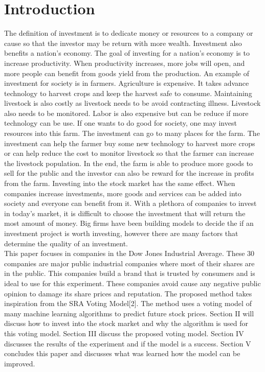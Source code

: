 \documentclass[journal]{IEEEtran}
\begin{document}
\section{Introduction}
The definition of investment is to dedicate money or resources to a company or cause so that the investor may be return with more wealth. Investment also benefits a nation's economy. The goal of investing for a nation's economy is to increase productivity. When productivity increases, more jobs will open, and more people can benefit from goods yield from the production. An example of investment for society is in farmers. Agriculture is expensive. It takes advance technology to harvest crops and keep the harvest safe to consume. Maintaining livestock is also costly as livestock needs to be avoid contracting illness. Livestock also needs to be monitored. Labor is also expensive but can be reduce if more technology can be use. If one wants to do good for society, one may invest resources into this farm. The investment can go to many places for the farm. The investment can help the farmer buy some new technology to harvest more crops or can help reduce the cost to monitor livestock so that the farmer can increase the livestock population. In the end, the farm is able to produce more goods to sell for the public and the investor can also be reward for the increase in profits from the farm. Investing into the stock market has the same effect. When companies increase investments, more goods and services can be added into society and everyone can benefit from it. With a plethora of companies to invest in today's market, it is difficult to choose the investment that will return the most amount of money. Big firms have been building models to decide the if an investment project is worth investing, however there are many factors that determine the quality of an investment.\\

This paper focuses in companies in the Dow Jones Industrial Average. These 30 companies are major public industrial companies where most of their shares are in the public. This companies build a brand that is trusted by consumers and is ideal to use for this experiment. These companies avoid cause any negative public opinion to damage its share prices and reputation. The proposed method takes inspiration from the SRA Voting Model[2]. The method uses a voting model of many machine learning algorithms to predict future stock prices. Section II will discuss how to invest into the stock market and why the algorithm is used for this voting model. Section III discuss the proposed voting model. Section IV discusses the results of the experiment and if the model is a success. Section V concludes this paper and discusses what was learned how the model can be improved.
\end{document}
